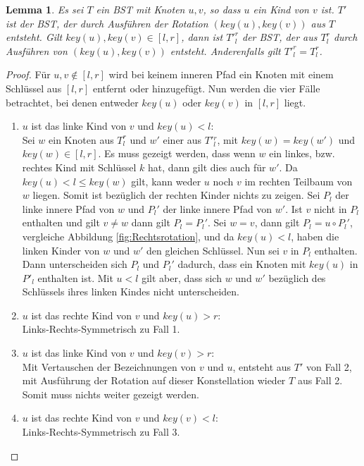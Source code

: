 \documentclass[a4paper,12pt]{article}
\newtheorem{Lemma}{Lemma}[section]
\begin{document}
\begin{Lemma}  \label{lemmaWilber1} Es sei $T$ ein BST mit Knoten $u, v$, so dass $u$ ein Kind von $v$ ist. $T'$ ist der BST, der durch Ausführen der Rotation $\left(\mathit{key}\left(u\right),\mathit{key}\left(v\right)\right)$ aus $T$ entsteht. Gilt $\mathit{key}\left(u\right),\mathit{key}\left(v\right) \in \left[l,r\right]$, dann ist ${T'}^r_l$ der BST, der aus $T^r_l$ durch Ausführen von  $\left(\mathit{key}\left(u\right),\mathit{key}\left(v\right)\right)$ entsteht. Anderenfalls gilt ${T'}^r_l = T^r_l$.
\end{Lemma}
\begin{proof}
	\noindent Für $u,v \notin \left[l,r\right]$ wird bei keinem inneren Pfad ein Knoten mit einem Schlüssel aus $\left[l,r\right]$ entfernt oder hinzugefügt.
	Nun werden die vier Fälle betrachtet, bei denen entweder $\mathit{key}\left(u\right)$ oder $\mathit{key}\left(v\right)$ in $\left[l,r\right]$ liegt.
	\begin{enumerate}
		\item $u$ ist das linke Kind von $v$ und $\mathit{key}\left(u\right) < l$:\\
		Sei $w$ ein Knoten aus $T^r_l$ und $w'$ einer aus $T'{^r_l}$, mit $\mathit{key}(w) = \mathit{key}(w')$ und $\mathit{key}(w) \in \left[l,r\right]$. Es muss gezeigt werden, dass wenn $w$ ein linkes, bzw. rechtes Kind mit Schlüssel $k$ hat, dann gilt dies auch für $w'$. Da $\mathit{key}(u) < l \leq \mathit{key}(w) $ gilt, kann weder $u$ noch $v$ im rechten Teilbaum von $w$ liegen. Somit ist bezüglich der rechten Kinder nichts zu zeigen. 
		Sei $P_l$ der linke innere Pfad von $w$ und $ {P_l}'$ der linke innere Pfad von $w'$. Ist $v$ nicht in $P_l$ enthalten und gilt $v \neq w$ dann gilt $P_l = P{_l}'$. Sei $w = v$, dann gilt $P_l = u  \circ  {P_l}'$, vergleiche Abbildung \ref{fig:Rechtsrotation}, und da $\mathit{key}(u) < l$, haben die linken Kinder von $w$ und $w'$ den gleichen Schlüssel. Nun sei $v$ in $P_l$ enthalten. Dann unterscheiden sich  $P_l$ und  ${P_l}'$ dadurch, dass ein Knoten mit $\mathit{key}(u)$ in $P'_l$ enthalten ist. Mit $u < l$ gilt aber, dass sich $w$ und $w'$ bezüglich des Schlüssels ihres linken Kindes nicht unterscheiden.
	   	\item $u$ ist das rechte Kind von $v$ und $\mathit{key}\left(u\right) > r$:\\
	    Links-Rechts-Symmetrisch zu Fall 1. 	
		\item $u$ ist das linke Kind von $v$ und $\mathit{key}\left(v\right) > r$:\\
		Mit Vertauschen der Bezeichnungen von $v$ und $u$, entsteht aus $T'$ von Fall 2, mit Ausführung der Rotation auf dieser Konstellation wieder $T$ aus Fall 2. Somit muss nichts weiter gezeigt werden. 
		\item $u$ ist das rechte Kind von $v$ und $\mathit{key}\left(v\right) < l$:\\
		Links-Rechts-Symmetrisch zu Fall 3. \\
		

\end{enumerate}
\end{proof}
\end{document}
